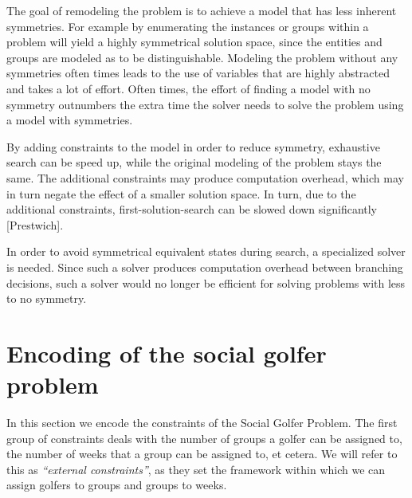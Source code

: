 \documentclass[a4paper]{scrartcl}
\begin{document}
The goal of remodeling the problem is to achieve a model that has less inherent symmetries. For example by enumerating the instances or groups within a problem will yield a highly symmetrical solution space, since the entities and groups are modeled as to be distinguishable. Modeling the problem without any symmetries often times leads to the use of variables that are highly abstracted and takes a lot of effort. Often times, the effort of finding a model with no symmetry outnumbers the extra time the solver needs to solve the problem using a model with symmetries.

By adding constraints to the model in order to reduce symmetry, exhaustive search can be speed up, while the original modeling of the problem stays the same. The additional constraints may produce computation overhead, which may in turn negate the effect of a smaller solution space. In turn, due to the additional constraints, first-solution-search can be slowed down significantly [Prestwich].

In order to avoid symmetrical equivalent states during search, a specialized solver is needed. Since such a solver produces computation overhead between branching decisions, such a solver would no longer be efficient for solving problems with less to no symmetry.






\section{Encoding of the social golfer problem}

In this section we encode the constraints of the Social Golfer Problem. The first group of constraints deals with the number of groups a golfer can be assigned to, the number of weeks that a group can be assigned to, et cetera. We will refer to this as \emph{``external constraints''}, as they set the framework within which we can assign golfers to groups and groups to weeks.
\end{document}
